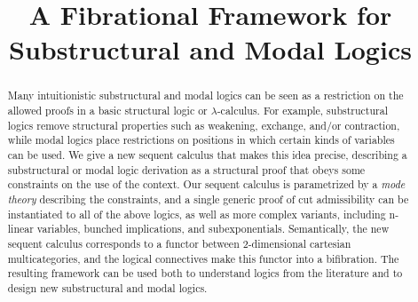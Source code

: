 \documentclass[conference,compsoconf]{../drl-common/IEEEtran}
\begin{document}
\title{A Fibrational Framework for \\ Substructural and Modal Logics}

\author{
\and
{}
\and
{}


}

\maketitle

\begin{abstract}
Many intuitionistic substructural and modal logics can be seen as a
restriction on the allowed proofs in a basic structural logic or
$\lambda$-calculus.  For example, substructural logics remove structural
properties such as weakening, exchange, and/or contraction, while modal
logics place restrictions on positions in which certain kinds of
variables can be used.  We give a new sequent calculus that makes this
idea precise, describing a substructural or modal logic derivation as a
structural proof that obeys some constraints on the use of the context.
Our sequent calculus is parametrized by a \emph{mode theory} describing
the constraints, and a single generic proof of cut admissibility can be
instantiated to all of the above logics, as well as more complex
variants, including n-linear variables, bunched implications, and
subexponentials.  Semantically, the new sequent calculus corresponds to
a functor between 2-dimensional cartesian multicategories, and the
logical connectives make this functor into a bifibration.  The resulting
framework can be used both to understand logics from the literature and
to design new substructural and modal logics.
\end{abstract}



   




\setlength{\bibsep}{-1pt} %
{ \small
\linespread{0.70}


}

\newpage
\clearpage

\appendix

\newpage


\newpage
\end{document}

